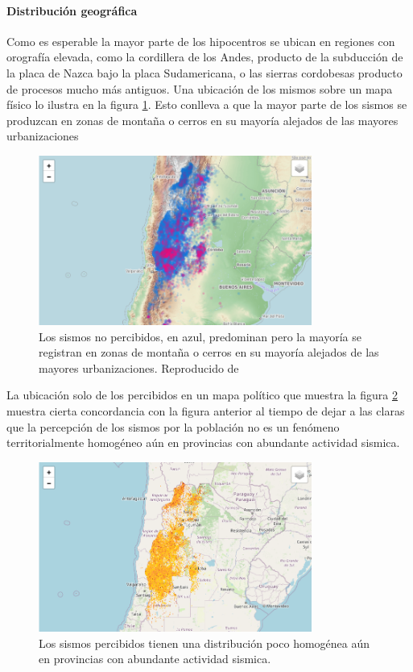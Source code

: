 \documentclass[a4paper]{report}
\begin{document}
\paragraph{Distribución geográfica}
Como es esperable la mayor parte de los hipocentros se ubican en regiones con orografía elevada, como la cordillera de los Andes, producto de la subducción de la placa de Nazca bajo la placa Sudamericana, o las sierras cordobesas producto de procesos mucho más antiguos. 
Una ubicación de los mismos sobre un mapa físico lo ilustra en la figura \ref{fig:mapa_sismos}.
Esto conlleva a que la mayor parte de los sismos se produzcan en zonas de montaña o cerros en su mayoría alejados de las mayores urbanizaciones
\begin{figure}[!h]
\centering
\includegraphics[width=0.8\textwidth]{mapa_sismos.png}
\caption{Los sismos no percibidos, en azul, predominan pero la mayoría se registran en zonas de montaña o cerros en su mayoría alejados de las mayores urbanizaciones.
Reproducido de \cite{daniela_parada_ic-datasets-docencia_nodate}}
\label{fig:mapa_sismos}
\end{figure}

La ubicación solo de los percibidos en un mapa político que muestra la figura \ref{fig:mapa_percibidos} muestra cierta concordancia con la figura anterior al tiempo de dejar a las claras que la percepción de los sismos por la población no es un fenómeno territorialmente homogéneo aún en provincias con abundante actividad sismica.
\begin{figure}[!h]
\centering
\includegraphics[width=0.8\textwidth]{mapa_percibidos.png}
\caption{Los sismos percibidos tienen una distribución poco homogénea aún en provincias con abundante actividad sismica.}
\label{fig:mapa_percibidos}
\end{figure}
\end{document}
